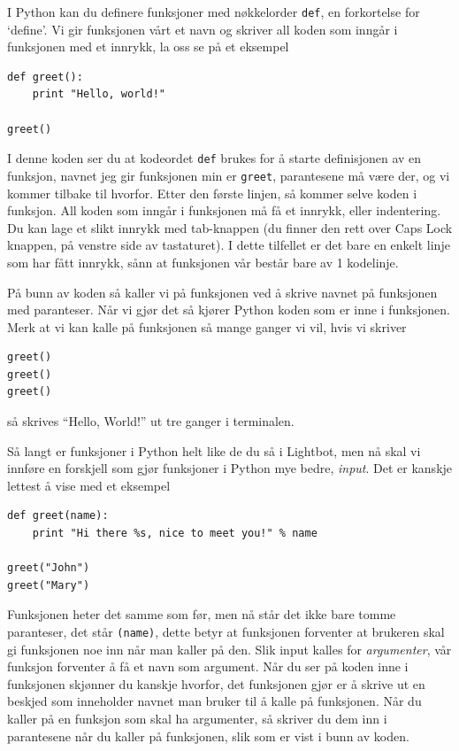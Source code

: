 \documentclass[a4paper, 11pt, notitlepage]{article}
\begin{document}
\clearpage

I Python kan du definere funksjoner med nøkkelorder \verb+def+, en forkortelse for `define'. Vi gir funksjonen vårt et navn og skriver all koden som inngår i funksjonen med et innrykk, la oss se på et eksempel
\begin{lstlisting}
def greet():
	print "Hello, world!"

greet()
\end{lstlisting}
I denne koden ser du at kodeordet \verb+def+ brukes for å starte definisjonen av en funksjon, navnet jeg gir funksjonen min er \verb+greet+, parantesene må være der, og vi kommer tilbake til hvorfor. Etter den første linjen, så kommer selve koden i funksjon. All koden som inngår i funksjonen må få et innrykk, eller indentering. Du kan lage et slikt innrykk med tab-knappen (du finner den rett over Caps Lock knappen, på venstre side av tastaturet). I dette tilfellet er det bare en enkelt linje som har fått innrykk, sånn at funksjonen vår består bare av 1 kodelinje.

På bunn av koden så kaller vi på funksjonen ved å skrive navnet på funksjonen med paranteser. Når vi gjør det så kjører Python koden som er inne i funksjonen. Merk at vi kan kalle på funksjonen så mange ganger vi vil, hvis vi skriver
\begin{lstlisting}
greet()
greet()
greet()
\end{lstlisting}
så skrives ``Hello, World!'' ut tre ganger i terminalen.

Så langt er funksjoner i Python helt like de du så i Lightbot, men nå skal vi innføre en forskjell som gjør funksjoner i Python mye bedre, \emph{input}. Det er kanskje lettest å vise med et eksempel
\begin{lstlisting}
def greet(name):
	print "Hi there %s, nice to meet you!" % name

greet("John")
greet("Mary")
\end{lstlisting}
Funksjonen heter det samme som før, men nå står det ikke bare tomme paranteser, det står \verb+(name)+, dette betyr at funksjonen forventer at brukeren skal gi funksjonen noe inn når man kaller på den. Slik input kalles for \emph{argumenter}, vår funksjon forventer å få et navn som argument. Når du ser på koden inne i funksjonen skjønner du kanskje hvorfor, det funksjonen gjør er å skrive ut en beskjed som inneholder navnet man bruker til å kalle på funksjonen. Når du kaller på en funksjon som skal ha argumenter, så skriver du dem inn i parantesene når du kaller på funksjonen, slik som er vist i bunn av koden.
\end{document}
